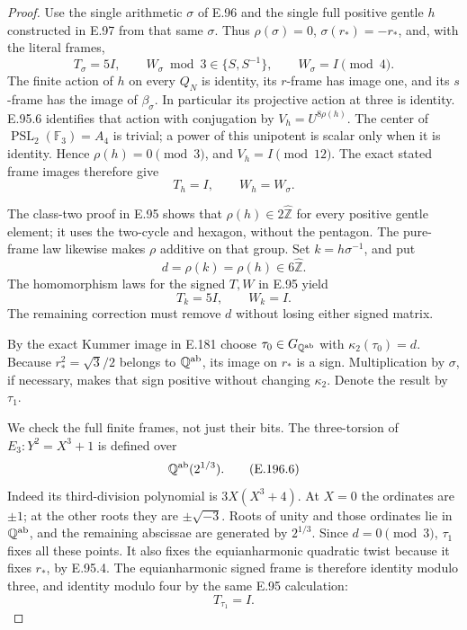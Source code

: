\begin{proof}
Use the single arithmetic \(\sigma\) of E.96 and the
single full positive gentle \(h\) constructed in E.97
from that same \(\sigma\).  Thus \(\rho(\sigma)=0\),
\(\sigma(r_*)=-r_*\), and, with the literal frames,
\[
        T_\sigma=5I,\qquad
        W_\sigma\bmod3\in\{S,S^{-1}\},\qquad
        W_\sigma=I\pmod4 .
\tag{E.196.2}
\]
The finite action of \(h\) on every \(Q_N\) is
identity, its \(r\)-frame has image one, and its
\(s\)-frame has the image of \(\beta_\sigma\).
In particular its projective action at three is
identity.  E.95.6 identifies that action with
conjugation by \(V_h=U^{8\rho(h)}\).
The center of \(\operatorname{PSL}_2(\mathbb F_3)=A_4\)
is trivial; a power of this unipotent is scalar only
when it is identity.  Hence \(\rho(h)=0\pmod3\),
and \(V_h=I\pmod{12}\).
The exact stated frame images therefore give
\[
                       T_h=I,\qquad W_h=W_\sigma .
\tag{E.196.3}
\]

The class-two proof in E.95 shows that
\(\rho(h)\in2\widehat{\mathbb Z}\) for every
positive gentle element; it uses the two-cycle
and hexagon, without the pentagon.
The pure-frame law likewise makes \(\rho\)
additive on that group.
Set \(k=h\sigma^{-1}\), and put
\[
                   d=\rho(k)=\rho(h)
                        \in6\widehat{\mathbb Z}.
\tag{E.196.4}
\]
The homomorphism laws for the signed \(T,W\)
in E.95 yield
\[
                         T_k=5I,\qquad W_k=I .
\tag{E.196.5}
\]
The remaining correction must remove \(d\)
without losing either signed matrix.

By the exact Kummer image in E.181 choose
\(\tau_0\in G_{\mathbb Q^{\rm ab}}\) with
\(\kappa_2(\tau_0)=d\).
Because \(r_*^2=\sqrt3/2\) belongs to
\(\mathbb Q^{\rm ab}\), its image on \(r_*\)
is a sign.  Multiplication by \(\sigma\),
if necessary, makes that sign positive
without changing \(\kappa_2\).  Denote the
result by \(\tau_1\).

We check the full finite frames, not just
their bits.  The three-torsion of
\(E_3:Y^2=X^3+1\) is defined over
\[
                 \mathbb Q^{\rm ab}(2^{1/3}).
\tag{E.196.6}
\]
Indeed its third-division polynomial is
\(3X(X^3+4)\).  At \(X=0\) the ordinates
are \(\pm1\); at the other roots they are
\(\pm\sqrt{-3}\).  Roots of unity and those
ordinates lie in \(\mathbb Q^{\rm ab}\),
and the remaining abscissae are generated
by \(2^{1/3}\).
Since \(d=0\pmod3\), \(\tau_1\) fixes
all these points.  It also fixes the
equianharmonic quadratic twist because
it fixes \(r_*\), by E.95.4.
The equianharmonic signed frame is therefore
identity modulo three, and identity modulo
four by the same E.95 calculation:
\[
                             T_{\tau_1}=I .
\tag{E.196.7}
\]


\end{proof}
